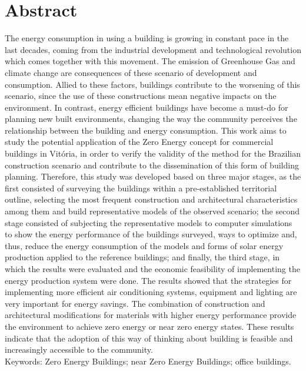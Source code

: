 \section*{Abstract}
    \thispagestyle{empty}
    The  energy consumption in using a building is growing in constant
    pace  in  the  last  decades, coming from the industrial development and 
    technological revolution which comes together with this movement. 
    The emission of Greenhouse Gas and climate change are consequences of these 
    scenario  of  development  and  consumption.  Allied  to  these  factors,  
    buildings  contribute  to  the worsening of this scenario, since the use of 
    these  constructions mean negative  impacts on  the environment.  In  contrast,  
    energy  efficient  buildings  have  become  a  must-do  for  planning  
    new built  environments,  changing  the  way  the  community  perceives  
    the  relationship  between  the building and energy consumption. This work 
    aims to study the potential application of the Zero Energy concept for commercial 
    buildings in Vitória, in order to verify the validity of the method for the 
    Brazilian construction scenario and contribute to the dissemination of this 
    form of building planning. Therefore, this study was developed based on three 
    major stages, as the first consisted of surveying the buildings within a 
    pre-established territorial outline, selecting the most frequent construction  
    and  architectural  characteristics  among  them  and  build  representative  
    models  of the  observed  scenario;  the  second  stage  consisted  of  subjecting  
    the  representative  models  to computer  simulations  to  show  the  energy  
    performance  of  the  buildings  surveyed,  ways  to optimize  and,  
    thus,  reduce  the  energy  consumption  of  the  models  and  forms  of  solar  
    energy production  applied  to  the  reference  buildings;  and  finally,  
    the  third  stage,  in  which  the  results were evaluated and the economic 
    feasibility of implementing the energy production system were done.  
    The  results  showed  that  the  strategies  for  implementing  more  efficient  
    air  conditioning systems,  equipment  and  lighting  are  very  important  
    for  energy  savings.  The  combination  of construction  and  architectural  
    modifications  for  materials  with  higher  energy  performance provide the 
    environment to achieve zero energy or near zero energy states. 
    These results indicate that the adoption of this way of thinking about building 
    is feasible and increasingly accessible to the community.\\

    \noindent Keywords: Zero Energy Buildings; near Zero Energy Buildings; office buildings.
    \pagebreak